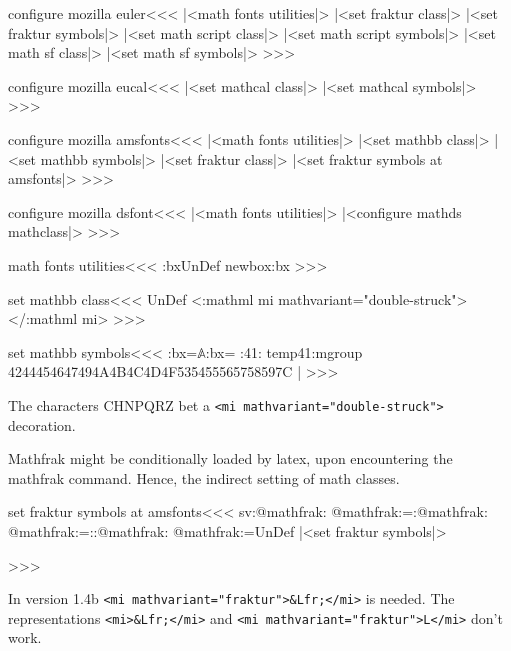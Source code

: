 \<configure mozilla euler\><<<
|<math fonts utilities|>
|<set fraktur class|>
|<set fraktur symbols|>
|<set math script class|>
|<set math script symbols|>
|<set math sf class|>
|<set math sf symbols|>
>>>

\<configure mozilla eucal\><<<
|<set mathcal class|>
|<set mathcal symbols|>
>>>

\<configure mozilla amsfonts\><<<
|<math fonts utilities|>
|<set mathbb class|>
|<set mathbb symbols|>
|<set fraktur class|>
|<set fraktur symbols at amsfonts|>
>>>


\<configure mozilla dsfont\><<<
|<math fonts utilities|>
|<configure mathds mathclass|>
>>>


\<math fonts utilities\><<<
\ifx \tmp:bx\:UnDef \csname newbox\endcsname \tmp:bx \fi
\def\find:set:mgroup#1#2#3{\bgroup
  \def\use@mathgroup##1##2##3{\relax
    \tmp:cnt=##2%
    \xdef\:temp####1{\noexpand\Configure{MathClass}{#2}%
        {}{}{}{\mathchar"0\the\tmp:cnt ####1}}%
  }%
  \setbox\tmp:bx=\hbox{$#1$}\setbox\tmp:bx=\hbox{}%
  \set:mgroup#3{}{}%
  \egroup
}
\def\set:mgroup#1#2{\if :#1#2:\else
   \:temp{#1#2}\expandafter\set:mgroup \fi}
>>>



\<set mathbb class\><<< 
\ifx \mathbbMathClass\:UnDef
  \NewMathClass\mathbbMathClass
\fi
{}
    {<\a:mathml mi mathvariant="double-struck">}{</\a:mathml mi>}{}  
>>>



\<set mathbb symbols\><<<
\find:set:mgroup{\mathbb{A}}{\mathbbMathClass}%
   {414244454647494A4B4C4D4F535455565758597C} |%
>>>

The characters CHNPQRZ bet a \verb+<mi mathvariant="double-struck">+    decoration.



Mathfrak might be conditionally loaded by latex, upon encountering
the mathfrak command. Hence, the indirect setting of math classes.

\<set fraktur symbols at amsfonts\><<<
\expandafter\ifx \csname sv:@mathfrak:\endcsname\relax
   \let\sv:@mathfrak:=\n:@mathfrak:
\fi
\def\n:@mathfrak:{\global\let\n:@mathfrak:=\sv:@mathfrak:
   \global\let\sv:@mathfrak:=\:UnDef
   |<set fraktur symbols|>%
}
\n:@mathfrak:
>>>


In version 1.4b   \verb+<mi mathvariant="fraktur">&Lfr;</mi>+
is needed. The representations
   \verb+<mi>&Lfr;</mi>+ and
   \verb+<mi mathvariant="fraktur">L</mi>+
don't work.

